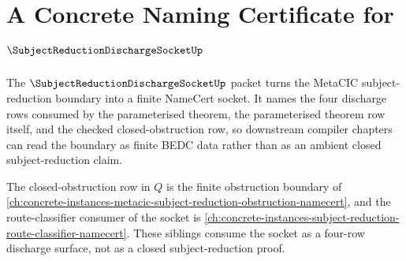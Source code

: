 \chapter{A Concrete Naming Certificate for $\SubjectReductionDischargeSocketUp$}
\label{ch:concrete-instances-subject-reduction-discharge-socket-namecert}

The $\SubjectReductionDischargeSocketUp$ packet turns the MetaCIC subject-reduction boundary into a finite NameCert socket. It names the four discharge rows consumed by the parameterised theorem, the parameterised theorem row itself, and the checked closed-obstruction row, so downstream compiler chapters can read the boundary as finite BEDC data rather than as an ambient closed subject-reduction claim.

The closed-obstruction row in $Q$ is the finite obstruction boundary of \autoref{ch:concrete-instances-metacic-subject-reduction-obstruction-namecert}, and the route-classifier consumer of the socket is \autoref{ch:concrete-instances-subject-reduction-route-classifier-namecert}. These siblings consume the socket as a four-row discharge surface, not as a closed subject-reduction proof.

